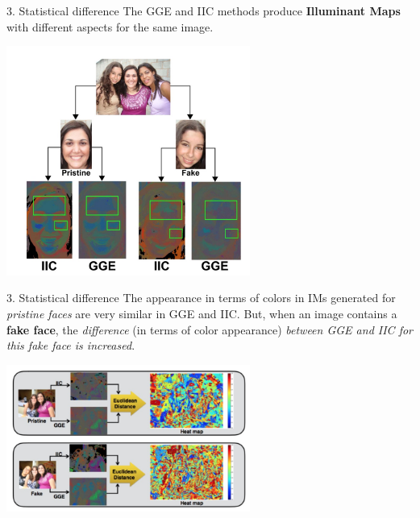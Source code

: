 \begin{tframe}{3. Statistical difference}
The GGE and IIC methods produce \textbf{Illuminant Maps} with different aspects for the same image.
\begin{center}
\includegraphics[width=0.6\textwidth]{images/difference.jpg}
\end{center}
\end{tframe}

\begin{tframe}{3. Statistical difference}
The appearance in terms of colors in IMs generated for \emph{pristine faces} are very similar in GGE and IIC. But, when an image contains a \textbf{fake face}, the \emph{difference} (in terms of color appearance) \emph{between GGE and IIC for this fake face is increased}.
\vspace{0.2cm}
\begin{center}
\includegraphics[width=0.6\textwidth]{images/victor.jpg}
\end{center}
\end{tframe}

